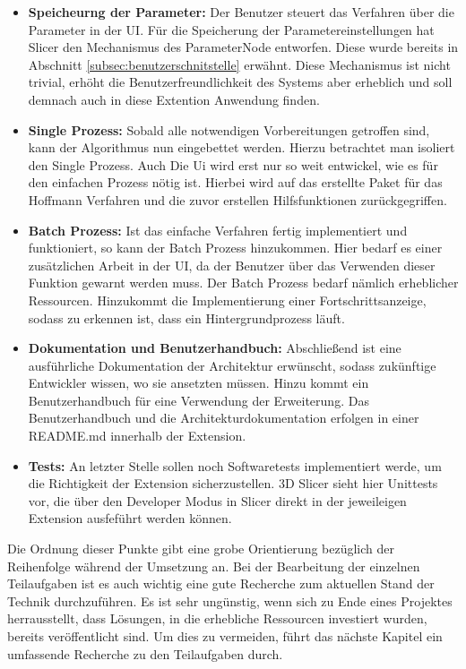 \begin{itemize}
	\item \textbf{Speicheurng der Parameter:} Der Benutzer steuert das Verfahren
		über die Parameter in der UI. Für die Speicherung der Parametereinstellungen
		hat Slicer den Mechanismus des ParameterNode entworfen. Diese wurde bereits
		in Abschnitt \ref{subsec:benutzerschnitstelle} erwähnt. Diese Mechanismus ist
		nicht trivial, erhöht die Benutzerfreundlichkeit des Systems aber erheblich
		und soll demnach auch in diese Extention Anwendung finden.

	\item \textbf{Single Prozess:} Sobald alle notwendigen Vorbereitungen
		getroffen sind, kann der Algorithmus nun eingebettet werden. Hierzu
		betrachtet man isoliert den Single Prozess. Auch Die Ui wird erst nur so weit
		entwickel, wie es für den einfachen Prozess nötig ist. Hierbei wird auf das erstellte
		Paket für das Hoffmann Verfahren und die zuvor erstellen Hilfsfunktionen zurückgegriffen.

	\item \textbf{Batch Prozess:} Ist das einfache Verfahren fertig implementiert
		und funktioniert, so kann der Batch Prozess hinzukommen. Hier bedarf es
		einer zusätzlichen Arbeit in der UI, da der Benutzer über das Verwenden dieser
		Funktion gewarnt werden muss. Der Batch Prozess bedarf nämlich erheblicher
		Ressourcen. Hinzukommt die Implementierung einer Fortschrittsanzeige, sodass
		zu erkennen ist, dass ein Hintergrundprozess läuft.

	\item \textbf{Dokumentation und Benutzerhandbuch:} Abschließend ist eine
		ausführliche Dokumentation der Architektur erwünscht, sodass zukünftige Entwickler
		wissen, wo sie ansetzten müssen. Hinzu kommt ein Benutzerhandbuch für eine Verwendung
		der Erweiterung. Das Benutzerhandbuch und die Architekturdokumentation
		erfolgen in einer README.md innerhalb der Extension.

	\item \textbf{Tests:} An letzter Stelle sollen noch Softwaretests
		implementiert werde, um die Richtigkeit der Extension sicherzustellen. 3D
		Slicer sieht hier Unittests vor, die über den Developer Modus in Slicer direkt
		in der jeweileigen Extension ausfeführt werden können.
\end{itemize}

Die Ordnung dieser Punkte gibt eine grobe Orientierung bezüglich der Reihenfolge
während der Umsetzung an. Bei der Bearbeitung der einzelnen Teilaufgaben ist es auch
wichtig eine gute Recherche zum aktuellen Stand der Technik durchzuführen. Es
ist sehr ungünstig, wenn sich zu Ende eines Projektes herrausstellt, dass
Lösungen, in die erhebliche Ressourcen investiert wurden, bereits veröffentlicht
sind. Um dies zu vermeiden, führt das nächste Kapitel ein umfassende Recherche
zu den Teilaufgaben durch.

